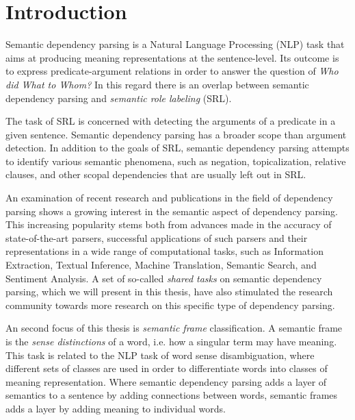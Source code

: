 \chapter{Introduction}
\label{chap:introduction}


Semantic dependency parsing is a Natural Language Processing (NLP) task that aims at producing meaning representations at the sentence-level. Its outcome is to express predicate-argument relations in order to answer the question of \textit{Who did What to Whom?} In this regard there is an overlap between semantic dependency parsing and \textit{semantic role labeling} (SRL). 

The task of SRL is concerned with detecting the arguments of a predicate in a given sentence. Semantic dependency parsing has a broader scope than argument detection. In addition to the goals of SRL, semantic dependency parsing attempts to identify various semantic phenomena, such as negation, topicalization, relative clauses, and other scopal dependencies that are usually left out in SRL.

An examination of recent research and publications in the field of dependency parsing shows a growing interest in the semantic aspect of dependency parsing. This increasing popularity stems both from advances made in the accuracy of state-of-the-art parsers, successful applications of such parsers and their representations in a wide range of computational tasks, such as Information Extraction, Textual Inference, Machine Translation, Semantic Search, and Sentiment Analysis. A set of so-called \textit{shared tasks} on semantic dependency parsing, which we will present in this thesis, have also stimulated the research community towards more research on this specific type of dependency parsing.

An second focus of this thesis is \textit{semantic frame} classification. A semantic frame is the \textit{sense distinctions} of a word, i.e. how a singular term may have meaning. This task is related to the NLP task of word sense disambiguation, where different sets of classes are used in order to differentiate words into classes of meaning representation. Where semantic dependency parsing adds a layer of semantics to a sentence by adding connections between words, semantic frames adds a layer by adding meaning to individual words.

